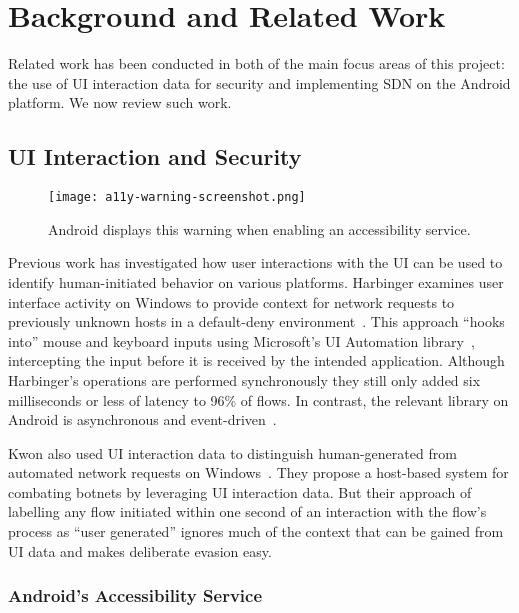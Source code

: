 \section{Background and Related Work}
\label{sec:related-work}

Related work has been conducted in both of the main focus areas of this project:
the use of UI interaction data for security and implementing SDN on the Android
platform. We now review such work.

\subsection{UI Interaction and Security}
\label{sec:ui-interaction-and-security}

\begin{wrapfigure}{R}{0.4\textwidth}
	\centering
	\texttt{[image: a11y-warning-screenshot.png]}
	\caption{Android displays this warning when enabling an accessibility
		service.}
	\label{fig:a11y-warning}
\end{wrapfigure}

Previous work has investigated how user interactions with the UI can be used to
identify human-initiated behavior on various platforms. Harbinger examines user
interface activity on Windows to provide context for network requests to
previously unknown hosts in a default-deny environment~\cite{chuluundorj2019}.
This approach ``hooks into'' mouse and keyboard inputs using Microsoft's UI
Automation library~\cite{microsoft2018}, intercepting the input before it is
received by the intended application. Although Harbinger's operations are
performed synchronously they still only added six milliseconds or less of
latency to 96\% of flows. In contrast, the relevant library on Android is
asynchronous and event-driven~\cite{googledevelopers2020}.

Kwon \etal also used UI interaction data to distinguish human-generated from
automated network requests on Windows~\cite{kwon2011}. They propose a host-based
system for combating botnets by leveraging UI interaction data. But their
approach of labelling any flow initiated within one second of an interaction
with the flow's process as ``user generated'' ignores much of the context that
can be gained from UI data and makes deliberate evasion easy.

\subsubsection{Android's Accessibility Service}
\label{sec:androids-accessibility-service}

